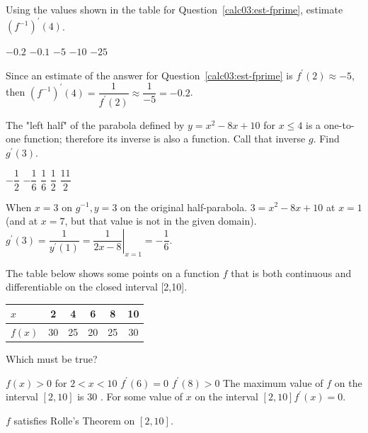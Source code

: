 \newpage



\question
Using the values shown in the table for Question~\ref{calc03:est-fprime}, estimate $\left(f^{-1}\right)^{\prime}(4)$.
\begin{choices}
  \CorrectChoice $-0.2$
  \choice $-0.1$
  \choice $-5$
  \choice $-10$
  \choice $-25$
\end{choices}
\begin{solution}
Since an estimate of the answer for Question~\ref{calc03:est-fprime} is $f^{\prime}(2) \approx-5$, then $\left(f^{-1}\right)^{\prime}(4)=\dfrac{1}{f^{\prime}(2)} \approx \dfrac{1}{-5}=-0.2$.
\end{solution}

\question
The "left half" of the parabola defined by $y=x^{2}-8 x+10$ for $x \leq 4$ is a one-to-one function; therefore its inverse is also a function. Call that inverse $g$. Find $g^{\prime}(3)$.
\begin{choices}
  \choice $-\dfrac{1}{2}$
  \CorrectChoice $-\dfrac{1}{6}$
  \choice $\dfrac{1}{6}$
  \choice $\dfrac{1}{2}$
  \choice $\dfrac{11}{2}$
\end{choices}
\begin{solution}
When $x=3$ on $g^{-1}, y=3$ on the original half-parabola. $3=x^{2}-8 x+10$ at $x=1$ (and at $x=7$, but that value is not in the given domain).\\
$g^{\prime}(3)=\dfrac{1}{y^{\prime}(1)}=\left.\dfrac{1}{2 x-8}\right|_{x=1}=-\dfrac{1}{6}$.
\end{solution}

\question
The table below shows some points on a function $f$ that is both continuous and differentiable on the closed interval [2,10].

\begin{center}
\begin{tabular}{l|c|c|c|c|c}
$x$ & 2 & 4 & 6 & 8 & 10 \\
\hline
$f(x)$ & 30 & 25 & 20 & 25 & 30 \\
\end{tabular}
\end{center}

Which must be true?
\begin{choices}
  \choice $f(x)>0$ for $2<x<10$
  \choice $f^{\prime}(6)=0$
  \choice $f^{\prime}(8)>0$
  \choice The maximum value of $f$ on the interval $[2,10]$ is $30$ .
  \CorrectChoice For some value of $x$ on the interval $[2,10] f^{\prime}(x)=0$.
\end{choices}
\begin{solution}
$f$ satisfies Rolle's Theorem on $[2,10]$.
\end{solution}




